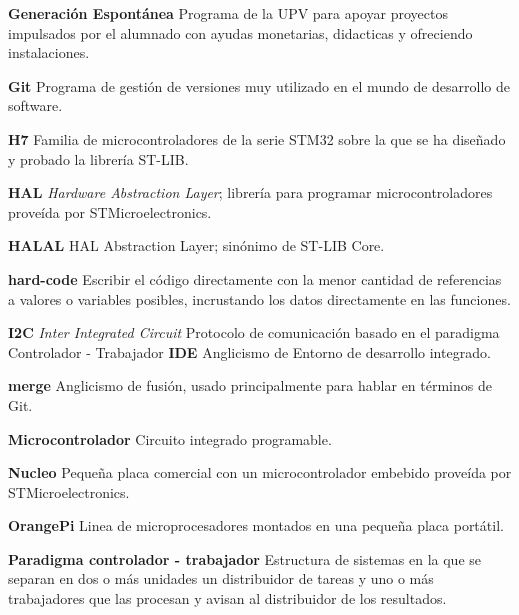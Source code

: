 \documentclass{report}
\begin{document}
\par \vspace{0.2 cm}
\textbf{Generación Espontánea} Programa de la UPV para apoyar proyectos impulsados por el alumnado con ayudas monetarias, didacticas y ofreciendo instalaciones. 
\par \vspace{0.2 cm}
\textbf{Git} Programa de gestión de versiones muy utilizado en el mundo de desarrollo de software.
\par \vspace{0.2 cm}
\textbf{H7} Familia de microcontroladores de la serie STM32 sobre la que se ha diseñado y probado la librería ST-LIB.
\par \vspace{0.2 cm}
\textbf{HAL} \textit{Hardware Abstraction Layer}; librería para programar microcontroladores proveída por STMicroelectronics.
\par \vspace{0.2 cm}
\textbf{HALAL} HAL Abstraction Layer; sinónimo de ST-LIB Core.
\par \vspace{0.2 cm}
\textbf{hard-code} Escribir el código directamente con la menor cantidad de referencias a valores o variables posibles, incrustando los datos directamente en las funciones.
\par \vspace{0.2 cm}
\textbf{I2C} \textit{Inter Integrated Circuit} Protocolo de comunicación basado  en el paradigma Controlador - Trabajador
\textbf{IDE} Anglicismo de Entorno de desarrollo integrado.
\par \vspace{0.2 cm}
\textbf{merge} Anglicismo de fusión, usado principalmente para hablar en términos de Git.
\par \vspace{0.2 cm}
\textbf{Microcontrolador} Circuito integrado programable.
\par \vspace{0.2 cm}
\textbf{Nucleo} Pequeña placa comercial con un microcontrolador embebido proveída por STMicroelectronics.
\par \vspace{0.2 cm}
\textbf{OrangePi} Linea de microprocesadores montados en una pequeña placa portátil.
\par \vspace{0.2 cm}
\textbf{Paradigma controlador - trabajador} Estructura de sistemas en la que se separan en dos o más unidades un distribuidor de tareas y uno o más trabajadores que las procesan y avisan al distribuidor de los resultados. 
\end{document}
